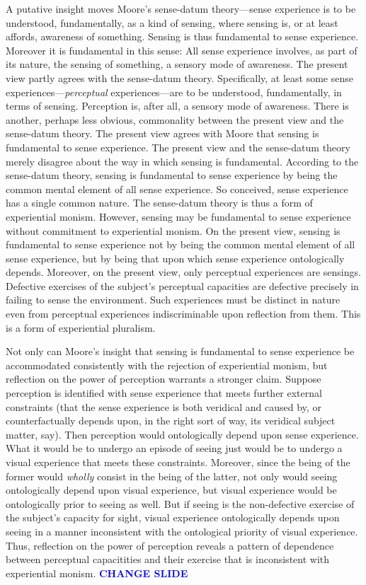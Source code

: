 \documentclass[12pt]{article}
\newcommand{\change}{\textcolor{blue}{\textbf{CHANGE SLIDE}}}
\begin{document}
A putative insight moves Moore's sense-datum theory---sense experience is to be understood, fundamentally, as a kind of sensing, where sensing is, or at least affords, awareness of something. Sensing is thus fundamental to sense experience. Moreover it is fundamental in this sense: All sense experience involves, as part of its nature, the sensing of something, a sensory mode of awareness. The present view partly agrees with the sense-datum theory. Specifically, at least some sense experiences---\emph{perceptual} experiences---are to be understood, fundamentally, in terms of sensing. Perception is, after all, a sensory mode of awareness. There is another, perhaps less obvious, commonality between the present view and the sense-datum theory. The present view agrees with Moore that sensing is fundamental to sense experience. The present view and the sense-datum theory merely disagree about the way in which sensing is fundamental. According to the sense-datum theory, sensing is fundamental to sense experience by being the common mental element of all sense experience. So conceived, sense experience has a single common nature. The sense-datum theory is thus a form of experiential monism. However, sensing may be fundamental to sense experience without commitment to experiential monism. On the present view, sensing is fundamental to sense experience not by being the common mental element of all sense experience, but by being that upon which sense experience ontologically depends. Moreover, on the present view, only perceptual experiences are sensings. Defective exercises of the subject's perceptual capacities are defective precisely in failing to sense the environment. Such experiences must be distinct in nature even from perceptual experiences indiscriminable upon reflection from them. This is a form of experiential pluralism. 

Not only can Moore's insight that sensing is fundamental to sense experience be accommodated consistently with the rejection of experiential monism, but reflection on the power of perception warrants a stronger claim. Suppose perception is identified with sense experience that meets further external constraints (that the sense experience is both veridical and caused by, or counterfactually depends upon, in the right sort of way, its veridical subject matter, say). Then perception would ontologically depend upon sense experience. What it would be to undergo an episode of seeing just would be to undergo a visual experience that meets these constraints. Moreover, since the being of the former would \emph{wholly} consist in the being of the latter, not only would seeing ontologically depend upon visual experience, but visual experience would be ontologically prior to seeing as well. But if seeing is the non-defective exercise of the subject's capacity for sight, visual experience ontologically depends upon seeing in a manner inconsistent with the ontological priority of visual experience. Thus, reflection on the power of perception reveals a pattern of dependence between perceptual capacitities and their exercise that is inconsistent with experiential monism. \change



%  
%  
\end{document}
